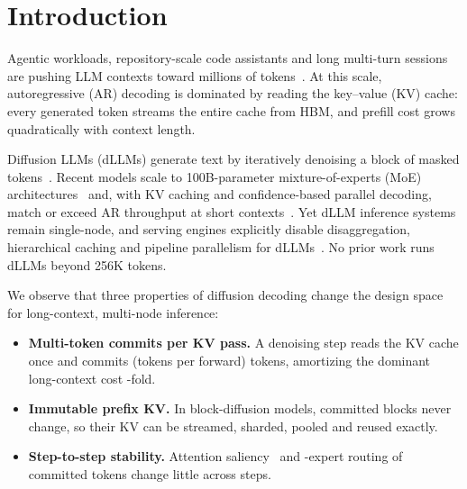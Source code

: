 \section{Introduction}
\label{sec:intro}

Agentic workloads, repository-scale code assistants and long multi-turn sessions are pushing LLM
contexts toward millions of tokens~\cite{yang2025qwen25_1m,yang2024contextparallel}. At this scale,
autoregressive (AR) decoding is dominated by reading the key--value (KV) cache: every generated token
streams the entire cache from HBM, and prefill cost grows quadratically with context length.

Diffusion LLMs (dLLMs) generate text by iteratively denoising a block of masked
tokens~\cite{nie2025llada,arriola2025blockdiffusion}. Recent models scale to 100B-parameter
mixture-of-experts (MoE) architectures~\cite{bie2025llada2,bie2026llada21,llada22} and, with KV caching
and confidence-based parallel decoding, match or exceed AR throughput at short
contexts~\cite{wu2025fastdllm,wu2025fastdllmv2,ma2025dinfer}. Yet dLLM inference systems remain
single-node, and serving engines explicitly disable disaggregation, hierarchical caching and pipeline
parallelism for dLLMs~\cite{sglangdllm}. No prior work runs dLLMs beyond 256K tokens.

We observe that three properties of diffusion decoding change the design space for long-context,
multi-node inference:
\begin{itemize}
  \item \textbf{Multi-token commits per KV pass.} A denoising step reads the KV cache once and commits
  \TPF (tokens per forward) tokens, amortizing the dominant long-context cost \TPF-fold.
  \item \textbf{Immutable prefix KV.} In block-diffusion models, committed blocks never change, so
  their KV can be streamed, sharded, pooled and reused exactly.
  \item \textbf{Step-to-step stability.} Attention saliency~\cite{song2025sparsedllm} and
  \hyp{expert routing of committed tokens} change little across steps.
\end{itemize}

